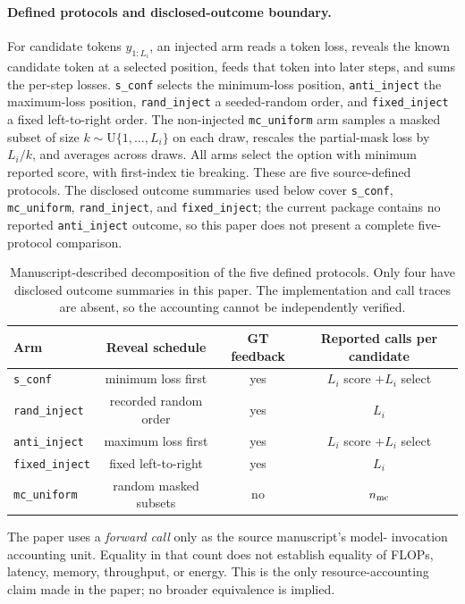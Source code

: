 \documentclass{article}
\newcommand{\sconf}{\texttt{s\_conf}}
\newcommand{\rinj}{\texttt{rand\_inject}}
\newcommand{\ainj}{\texttt{anti\_inject}}
\newcommand{\finj}{\texttt{fixed\_inject}}
\newcommand{\mcu}{\texttt{mc\_uniform}}
\begin{document}
\paragraph{Defined protocols and disclosed-outcome boundary.}
For candidate tokens $y_{1:L_i}$, an injected arm reads a token loss, reveals
the known candidate token at a selected position, feeds that token into later
steps, and sums the per-step losses.  \sconf{} selects the minimum-loss
position, \ainj{} the maximum-loss position, \rinj{} a seeded-random order,
and \finj{} a fixed left-to-right order.  The non-injected \mcu{} arm samples
a masked subset of size $k\sim\mathrm{U}\{1,\ldots,L_i\}$ on each draw,
rescales the partial-mask loss by $L_i/k$, and averages across draws.  All arms
select the option with minimum reported score, with first-index tie breaking.
These are five source-defined protocols.  The disclosed outcome summaries used
below cover \sconf{}, \mcu{}, \rinj{}, and \finj{}; the current package contains
no reported \ainj{} outcome, so this paper does not present a complete
five-protocol comparison.

\begin{table}[H]
\centering
\small
\setlength{\tabcolsep}{3.2pt}
\caption{Manuscript-described decomposition of the five defined protocols.
Only four have disclosed outcome summaries in this paper.  The implementation
and call traces are absent, so the accounting cannot be independently
verified.}
\label{tab:arms}
\begin{tabular}{@{}lccc@{}}
\toprule
Arm & Reveal schedule & GT feedback & Reported calls per candidate \\
\midrule
\sconf{} & minimum loss first & yes & $L_i$ score $+L_i$ select \\
\rinj{} & recorded random order & yes & $L_i$ \\
\ainj{} & maximum loss first & yes & $L_i$ score $+L_i$ select \\
\finj{} & fixed left-to-right & yes & $L_i$ \\
\mcu{} & random masked subsets & no & $n_{\rm mc}$ \\
\bottomrule
\end{tabular}
\end{table}

The paper uses a \emph{forward call} only as the source manuscript's model-
invocation accounting unit.  Equality in that count does not establish
equality of FLOPs, latency, memory, throughput, or energy.  This is the only
resource-accounting claim made in the paper; no broader equivalence is implied.
\end{document}
